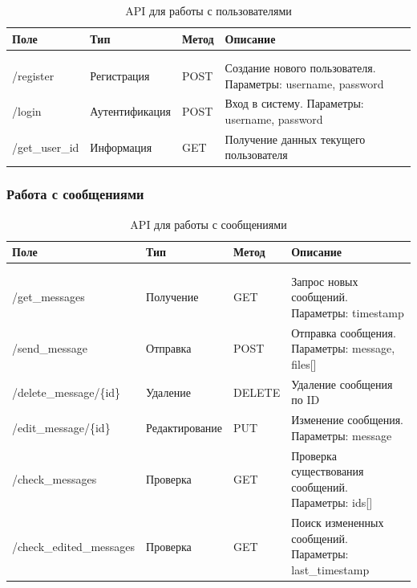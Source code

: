 \begin{xltabular}{\textwidth}{|l|l|p{1.7cm}|X|}
	\caption{API для работы с пользователями}\label{tab:users_api} \\ \hline
	\centrow Поле & \centrow Тип & \centrow Метод & \centrow Описание \\ \hline
	 &  &  &  \\ \hline
	\endfirsthead
	 &  &  &  \\ \hline
	\finishhead
	/register & Регистрация & POST & Создание нового пользователя. Параметры: username, password \\ \hline 
	/login & Аутентификация & POST & Вход в систему. Параметры: username, password \\ \hline 
	/get\_user\_id & Информация & GET & Получение данных текущего пользователя \\ \hline 
\end{xltabular}

\subsubsection{Работа с сообщениями}

\begin{xltabular}{\textwidth}{|l|l|p{1.7cm}|X|}
	\caption{API для работы с сообщениями}\label{tab:messages_api} \\ \hline
	\centrow Поле & \centrow Тип & \centrow Метод & \centrow Описание \\ \hline
	 &  &  &  \\ \hline
	\endfirsthead
	 &  &  &  \\ \hline
	\finishhead
	/get\_messages & Получение & GET & Запрос новых сообщений. Параметры: timestamp \\ \hline 
	/send\_message & Отправка & POST & Отправка сообщения. Параметры: message, files[] \\ \hline 
	/delete\_message/\{id\} & Удаление & DELETE & Удаление сообщения по ID \\ \hline 
	/edit\_message/\{id\} & Редактирование & PUT & Изменение сообщения. Параметры: message \\ \hline 
	/check\_messages & Проверка & GET & Проверка существования сообщений. Параметры: ids[] \\ \hline 
	/check\_edited\_messages & Проверка & GET & Поиск измененных сообщений. Параметры: last\_timestamp \\ \hline 
\end{xltabular}
\newpage
